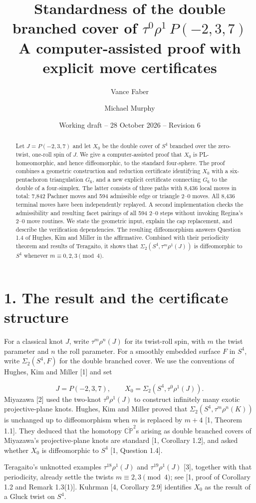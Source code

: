 \documentclass[11pt,letterpaper]{article}
\title{Standardness of the double branched cover of $\tau^0\rho^1\,P(-2,3,7)$\\[0.4em]\large A computer-assisted proof with explicit move certificates}
\author{Vance Faber \and Michael Murphy}
\date{Working draft -- 28 October 2026 -- Revision 6}
\begin{document}
\maketitle
\begin{abstract}
Let $J=P(-2,3,7)$ and let $X_0$ be the double cover of $S^4$ branched over the zero-twist, one-roll spin of $J$. We give a computer-assisted proof that $X_0$ is PL-homeomorphic, and hence diffeomorphic, to the standard four-sphere. The proof combines a geometric construction and reduction certificate identifying $X_0$ with a six-pentachoron triangulation $G_6$, and a new explicit certificate connecting $G_6$ to the double of a four-simplex. The latter consists of three paths with 8,436 local moves in total: 7,842 Pachner moves and 594 admissible edge or triangle 2--0 moves. All 8,436 terminal moves have been independently replayed. A second implementation checks the admissibility and resulting facet pairings of all 594 2--0 steps without invoking Regina's 2--0 move routines. We state the geometric input, explain the cap replacement, and describe the verification dependencies. The resulting diffeomorphism answers Question 1.4 of Hughes, Kim and Miller in the affirmative. Combined with their periodicity theorem and results of Teragaito, it shows that $\Sigma_2(S^4,\tau^m\rho^1(J))$ is diffeomorphic to $S^4$ whenever $m\equiv0,2,3\pmod4$.
\end{abstract}
\section*{1. The result and the certificate structure}
For a classical knot $J$, write $\tau^m\rho^n(J)$ for its twist-roll spin, with $m$ the twist parameter and $n$ the roll parameter. For a smoothly embedded surface $F$ in $S^4$, write $\Sigma_2(S^4,F)$ for the double branched cover. We use the conventions of Hughes, Kim and Miller [1] and set

\[
J=P(-2,3,7),\qquad X_0=\Sigma_2\!\left(S^4,\tau^0\rho^1(J)\right).
\]
Miyazawa [2] used the two-knot $\tau^0\rho^1(J)$ to construct infinitely many exotic projective-plane knots. Hughes, Kim and Miller proved that $\Sigma_2(S^4,\tau^m\rho^n(K))$ is unchanged up to diffeomorphism when $m$ is replaced by $m+4$ [1, Theorem 1.1]. They deduced that the homotopy $\overline{\mathbb{CP}}^{2}$s arising as double branched covers of Miyazawa's projective-plane knots are standard [1, Corollary 1.2], and asked whether $X_0$ is diffeomorphic to $S^4$ [1, Question 1.4].

Teragaito's unknotted examples $\tau^{18}\rho^1(J)$ and $\tau^{19}\rho^1(J)$ [3], together with that periodicity, already settle the twists $m\equiv2,3\pmod4$; see [1, proof of Corollary 1.2 and Remark 1.3(1)]. Kuhrman [4, Corollary 2.9] identifies $X_0$ as the result of a Gluck twist on $S^4$.
\end{document}
